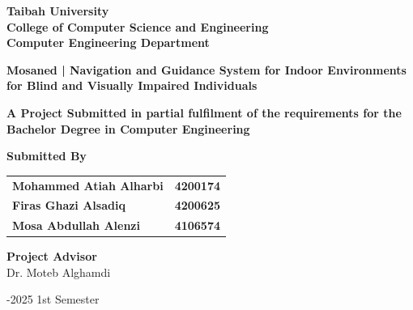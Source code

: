 \begin{titlepage}
    {\titlefont \textbf{Taibah University}}\\
    {\titlefont \textbf{College of Computer Science and Engineering}}\\
    {\titlefont \textbf{Computer Engineering Department}}\\
    
    \vspace{1.8cm}
    
    {\titlefont \textbf{Mosaned | Navigation and Guidance System for Indoor Environments for Blind and Visually Impaired Individuals}}
    
    \vspace{1.8cm}

    {\titlefont \fontsize{14}{16} \textbf{A Project Submitted in partial fulfilment of the requirements for the Bachelor Degree in Computer Engineering}}
    \vspace{1.8cm}
    
    \vspace{1.2cm}
    
    \begin{minipage}{\textwidth}
    	\centering
    	{\titlefont \textbf{Submitted By}}\\
    	\vspace{1cm}
    	
    	\begin{tabular}{@{}l@{\hskip 4cm}r@{}}
    		{\titlefont \textbf{Mohammed Atiah Alharbi}} & {\titlefont \textbf{4200174}} \\
    		{\titlefont \textbf{Firas Ghazi Alsadiq}} & {\titlefont \textbf{4200625}} \\
    		{\titlefont \textbf{Mosa Abdullah Alenzi}} & {\titlefont \textbf{4106574}} \\
    	\end{tabular}
    \end{minipage}
    
    \vspace{1.8cm}

    {\selectfont\fontsize{14}{16}\normalfont
    \textbf{Project Advisor}\\
    Dr. Moteb Alghamdi
    }
    
    \vspace{2cm}

    {\selectfont\fontsize{14}{16}-2025  1st Semester
    }

\end{titlepage}
